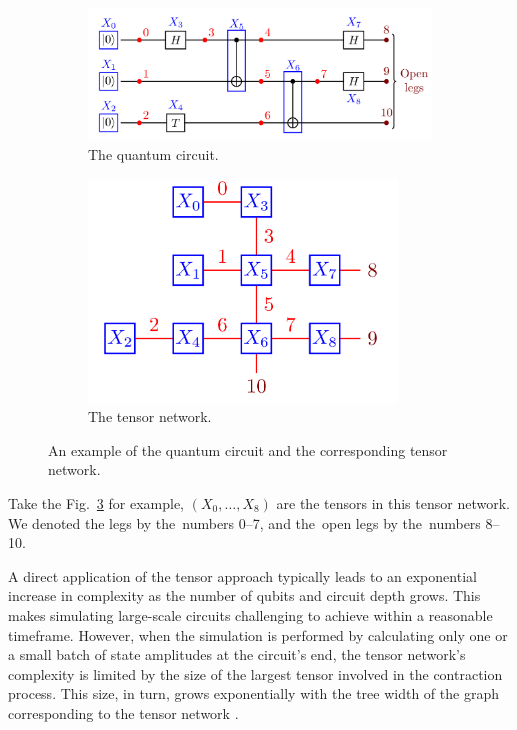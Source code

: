 \begin{figure}
    \centering
    \begin{subfigure}{0.5\textwidth}
        \centering
        \includegraphics[width=\textwidth]{images/6_3_circ.png}
        \caption{The quantum circuit.}
        \label{6_3_circ}
    \end{subfigure}
    \begin{subfigure}{0.4\textwidth}
        \centering
        \includegraphics[width=0.9\textwidth]{images/6_3_tn.png}
        \caption{The tensor network.}
        \label{6_3_tn}
    \end{subfigure}
    \caption{An example of the quantum circuit and the corresponding tensor network.}
    \label{fig:6_3_tn_circ}
\end{figure}

Take the Fig.~\ref{fig:6_3_tn_circ} for example, $(X_{0}, \ldots, X_{8})$ are the tensors in this tensor network. We denoted the legs by the~numbers 0--7, and the~open legs by the~numbers 8--10.

A direct application of the tensor approach typically leads to an exponential increase in complexity as the number of qubits and circuit depth grows. This makes simulating large-scale circuits challenging to achieve within a reasonable timeframe. However, when the simulation is performed by calculating only one or a small batch of state amplitudes at the circuit's end, the tensor network's complexity is limited by the size of the largest tensor involved in the contraction process. This size, in turn, grows exponentially with the tree width of the graph corresponding to the tensor network \cite{Markov_2008}.

